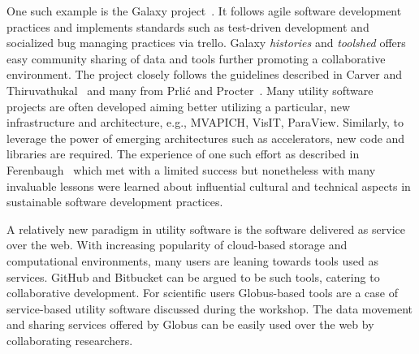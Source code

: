 \documentclass[11pt, oneside]{amsart}
\newcommand{\note}[1]{ {\textcolor{red}    { #1 }}}
\newcommand{\toolname}[1] {\textsf{#1}}
\begin{document}
One such example is the \toolname{Galaxy} project~\cite{Galaxy}. It
follows agile software development practices and implements standards
such as test-driven development and socialized bug managing practices
via \toolname{trello}. Galaxy \emph{histories} and \emph{toolshed}
offers easy community sharing of data and tools further promoting a
collaborative environment. The project closely follows the
guidelines described in Carver and Thiruvathukal~\cite{Carver_WSSSPE}
and many from Prli\'{c} and Procter~\cite{Prlic_WSSSPE}. Many utility
software projects are often developed aiming better utilizing a
particular, new infrastructure and architecture, e.g.,
\toolname{MVAPICH}, \toolname{VisIT}, \toolname{ParaView}. Similarly, to leverage the power
of emerging architectures such as accelerators, new code and libraries
are required. The experience of one such effort as described in
Ferenbaugh~\cite{Ferenbaugh_WSSSPE} which met with a limited success
but nonetheless with many invaluable lessons were learned about
influential cultural and technical aspects in sustainable software
development practices.

A relatively new paradigm in utility software is the software
delivered as service over the web. With increasing popularity of
cloud-based storage and computational environments, many users are
leaning towards tools used as services. \toolname{GitHub} and
\toolname{Bitbucket} can be argued to be such tools, catering to
collaborative development. For scientific users
\toolname{Globus}-based tools are a case of service-based utility
software discussed during the workshop. The data movement and sharing
services offered by Globus can be easily used over the web by
collaborating researchers.
\end{document}
